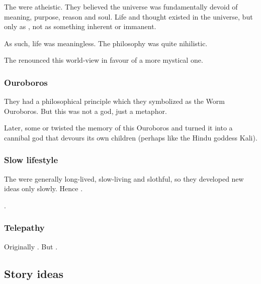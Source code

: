 The \ophidians were atheistic. 
They believed the universe was fundamentally devoid of meaning, purpose, reason and soul.
Life and thought existed in the universe, but only as , not as something inherent or immanent. 

As such, life was meaningless. 
The \ophidian philosophy was quite nihilistic. 

The  renounced this world-view in favour of a more mystical one.





\subsubsection{Ouroboros}
They had a philosophical principle which they symbolized as the Worm Ouroboros. 
But this was not a god, just a metaphor. 

Later, some  \ophidians or \quiljaaran twisted the memory of this Ouroboros and turned it into a cannibal god that devours its own children (perhaps like the Hindu goddess Kali). 





\subsubsection{Slow lifestyle}
The \ophidians were generally long-lived, slow-living and slothful, so they developed new ideas only slowly. 
Hence .

\Sethicus {}. 





\subsubsection{Telepathy}
Originally . 
But . 









\subsection{Story ideas}
